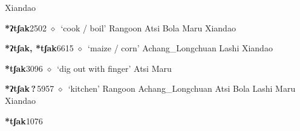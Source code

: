 \begin{list}{}{\leftmargin=1.5em \itemindent=-1.5em}
         Xiandao 
  \item {\footnotesize \textbf{*ʔtʃak}}{\tiny 2502}
\hspace{1ex}
         $\diamond$~`cook / boil'
         Rangoon 
\hspace{1ex}
         Atsi 
\hspace{1ex}
         Bola 
\hspace{1ex}
         Maru 
\hspace{1ex}
         Xiandao 
  \item {\footnotesize \textbf{*ʔtʃak, *tʃak}}{\tiny 6615}
\hspace{1ex}
         $\diamond$~`maize / corn'
         Achang\_Longchuan 
\hspace{1ex}
         Lashi 
\hspace{1ex}
         Xiandao 
  \item {\footnotesize \textbf{*tʃak}}{\tiny 3096}
\hspace{1ex}
         $\diamond$~`dig out with finger'
         Atsi 
\hspace{1ex}
         Maru 
  \item {\footnotesize \textbf{*ʔtʃak\,?\,}}{\tiny 5957}
\hspace{1ex}
         $\diamond$~`kitchen'
         Rangoon 
\hspace{1ex}
         Achang\_Longchuan 
\hspace{1ex}
         Atsi 
\hspace{1ex}
         Bola 
\hspace{1ex}
         Lashi 
\hspace{1ex}
         Maru 
\hspace{1ex}
         Xiandao 
  \item {\footnotesize \textbf{*tʃak}}{\tiny 1076}

\end{list}
